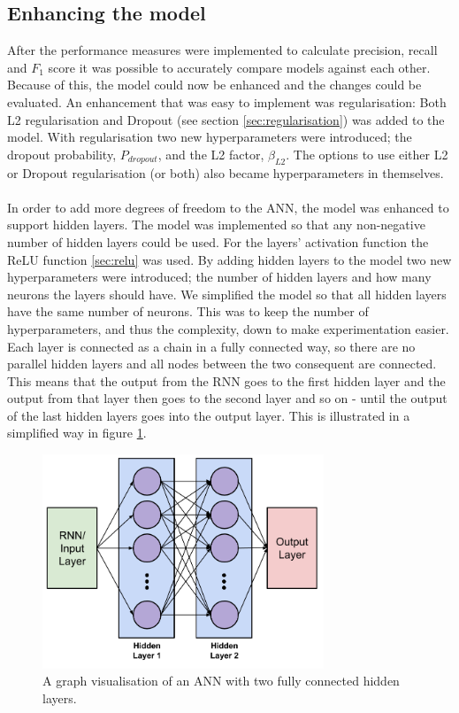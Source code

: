 \subsection{Enhancing the model}\label{sect:enhacing_the_model}
After the performance measures were implemented to calculate precision, recall and $F_1$ score it was possible to accurately compare models against each other. Because of this, the model could now be enhanced and the changes could be evaluated. An enhancement that was easy to implement was regularisation: Both L2 regularisation and Dropout (see section \ref{sec:regularisation}) was added to the model. With regularisation two new hyperparameters were introduced; the dropout probability, $P_{dropout}$, and the L2 factor, $\beta_{L2}$. The options to use either L2 or Dropout regularisation (or both) also became hyperparameters in themselves.
\\\\
In order to add more degrees of freedom to the ANN, the model was enhanced to support hidden layers. The model was implemented so that any non-negative number of hidden layers could be used. For the layers' activation function the ReLU function \ref{sec:relu} was used. By adding hidden layers to the model two new hyperparameters were introduced; the number of hidden layers and how many neurons the layers should have. We simplified the model so that all hidden layers have the same number of neurons. This was to keep the number of hyperparameters, and thus the complexity, down to make experimentation easier. Each layer is connected as a chain in a fully connected way, so there are no parallel hidden layers and all nodes between the two consequent are connected. This means that the output from the RNN goes to the first hidden layer and the output from that layer then goes to the second layer and so on - until the output of the last hidden layers goes into the output layer. This is illustrated in a simplified way in figure \ref{fig:ann_hidden_layers}.
\begin{figure}[h!]
    \centering
    \includegraphics[width=0.75\textwidth]{figure/method/ann_hidden_layers}
    \caption{A graph visualisation of an ANN with two fully connected hidden layers.}
    \label{fig:ann_hidden_layers}
\end{figure}
